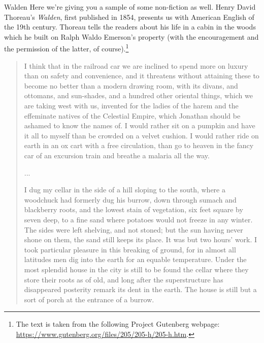 \begin{texts}{Walden}
Here we're giving you a sample of some non-fiction as well. Henry David Thoreau's \textit{Walden}, first published in 1854, presents us with American English of the 19th century. Thoreau tells the readers about his life in a cabin in the woods which he built on Ralph Waldo Emerson's property (with the encouragement and the permission of the latter, of course).\footnote{The text is taken from the following Project Gutenberg webpage: \url{https://www.gutenberg.org/files/205/205-h/205-h.htm}.}

\begin{quote}
\internallinenumbers*{}
    I think that in the railroad car we are inclined to spend more on luxury than on safety and convenience, and it threatens without attaining these to become no better than a modern drawing room, with its divans, and ottomans, and sun-shades, and a hundred other oriental things, which we are taking west with us, invented for the ladies of the harem and the effeminate natives of the Celestial Empire, which Jonathan should be ashamed to know the names of. I would rather sit on a pumpkin and have it all to myself than be crowded on a velvet cushion. I would rather ride on earth in an ox cart with a free circulation, than go to heaven in the fancy car of an excursion train and breathe a malaria all the way.
    
    ...
    
    I dug my cellar in the side of a hill sloping to the south, where a woodchuck had formerly dug his burrow, down through sumach and blackberry roots, and the lowest stain of vegetation, six feet square by seven deep, to a fine sand where potatoes would not freeze in any winter. The sides were left shelving, and not stoned; but the sun having never shone on them, the sand still keeps its place. It was but two hours' work. I took particular pleasure in this breaking of ground, for in almost all latitudes men dig into the earth for an equable temperature. Under the most splendid house in the city is still to be found the cellar where they store their roots as of old, and long after the superstructure has disappeared posterity remark its dent in the earth. The house is still but a sort of porch at the entrance of a burrow.
    

\end{quote}
\end{texts}
